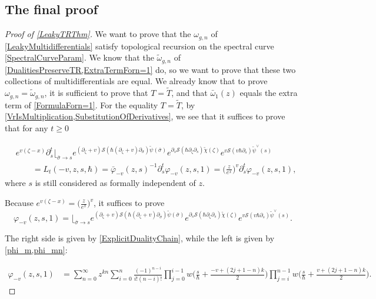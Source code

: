 \documentclass[10pt,a4paper,oneside,no-math,reqno]{amsart}%
\theoremstyle{plain}
\theoremstyle{definition}
\theoremstyle{remark}
\numberwithin{equation}{section}
\renewcommand{\phi}{\varphi}
\newcommand{\mc}[1]{\mathcal{#1}}
\newcommand{\1}{\mathds{1}}
\newcommand{\<}{\langle}
\renewcommand{\>}{\rangle}
\newcommand{\del}{\partial}
\begin{document}
\subsection{The final proof}

\begin{proof}[Proof of \cref{LeakyTRThm}]
	We want to prove that the $ \omega_{g,n}$ of \cref{LeakyMultidifferentials} satisfy topological recursion on the spectral curve \eqref{SpectralCurveParam}. We know that the $ \tilde{\omega}_{g,n}$ of \cref{DualitiesPreserveTR,ExtraTermForn=1} do, so we want to prove that these two collections of multidifferentials are equal. We already know that to prove $ \omega_{g,n} = \tilde{\omega}_{g,n}$, it is sufficient to prove that $ T = \tilde{T}$, and that $ \bar{\omega}_1(z) $ equals the extra term of \cref{FormulaForn=1}. For the equality $ T = \tilde{T}$, by \cref{VrIsMultiplication,SubstitutionOfDerivatives}, we see that it suffices to prove that for any $ t \geq 0$

	\begin{equation}\label{LAsExponentials}
		\begin{split}
			&e^{v (\zeta - x)}
			\del_s^t \Big\lfloor_{\bar{\sigma} \to s}
			e^{ (\del_\zeta +v) \mc{S}( \hbar (\del_\zeta + v) \del_{\bar{\sigma}} )\tilde{\psi} (\bar{\sigma}) }
			e^{ \del_s \mc{S}( \hbar \del_\zeta \del_s ) \tilde{\chi} (\zeta) }
			e^{v \mc{S}(v \hbar \del_s) \tilde{\psi}^\vee (s)}
			\\
			&\qquad =
			L_t(-v, z, s, \hbar)
			=
			\bar{\phi}_{-v}(z,s)^{-1} \del_s^t \phi_{-v}(z, s, 1)
			=
			\Big( \frac{z}{e^x} \Big)^{v} \del_s^t \phi_{-v}(z, s, 1) ,
		\end{split}
	\end{equation}
	where $s$ is still considered as formally independent of $ z$.\par
	Because $ e^{v(\zeta - x)} = \big( \frac{z}{e^x} \big)^v$, it suffices to prove
	\begin{equation}\label{phiAsExponentials}
		\phi_{-v}(z, s, 1)
		=
		\Big\lfloor_{\bar{\sigma} \to s}
		e^{ (\del_\zeta +v) \mc{S}( \hbar (\del_\zeta + v) \del_{\bar{\sigma}} )\tilde{\psi} (\bar{\sigma}) }
		e^{ \del_s \mc{S}( \hbar \del_\zeta \del_s ) \tilde{\chi} (\zeta) }
		e^{v \mc{S}(v \hbar \del_s) \tilde{\psi}^\vee (s)} .
	\end{equation}

	The right side is given by \cref{ExplicitDualityChain}, while the left is given by \cref{phi_m,phi_mn}:

	\begin{equation*}
		\begin{split}
			\phi_{-v} ( z, s, 1) 
			&=
			\sum_{n=0}^\infty z^{kn} \sum_{i=0}^n \frac{(-1)^{n-i}}{i!(n-i)!} \prod_{j=0}^{i-1} w \big( \frac{s}{\hbar} + \frac{-v + (2j+1-n)k}{2} \big) \prod_{j=i}^{n-1} w \big( \frac{s}{\hbar} + \frac{v + (2j+1-n)k}{2} \big) .
		\end{split}
	\end{equation*}


\end{proof}
\end{document}
